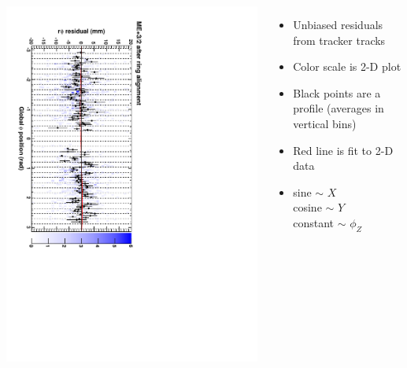 \documentclass[compress]{beamer}
\begin{document}
\begin{frame}
\begin{columns}
\includegraphics[height=\linewidth, angle=90]{ringfits_after/mep32.pdf}
\begin{itemize}
\item Unbiased residuals from tracker tracks
\item Color scale is 2-D plot
\item Black points are a profile (averages in vertical bins)
\item Red line is fit to 2-D data
\item sine $\sim$ $X$ \\
cosine $\sim$ $Y$ \\
constant $\sim$ $\phi_Z$
\end{itemize}
\end{columns}
\end{frame}
\end{document}
